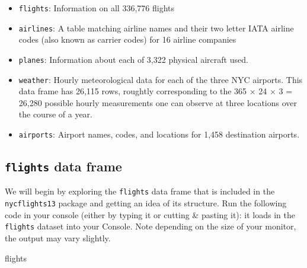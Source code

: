 \documentclass[
  letterpaper,
  DIV=11,
  numbers=noendperiod]{scrreprt}
\newenvironment{Shaded}{\begin{snugshade}}{\end{snugshade}}
\newcommand{\NormalTok}[1]{\textcolor[rgb]{0.00,0.23,0.31}{#1}}
\providecommand{\tightlist}{%
  \setlength{\itemsep}{0pt}\setlength{\parskip}{0pt}}\usepackage{longtable,booktabs,array}
\theoremstyle{definition}
\theoremstyle{remark}
\begin{document}
\begin{itemize}
\tightlist
\item
  \texttt{flights}: Information on all 336,776 flights
\item
  \texttt{airlines}: A table matching airline names and their two letter
  IATA airline codes (also known as carrier codes) for 16 airline
  companies
\item
  \texttt{planes}: Information about each of 3,322 physical aircraft
  used.
\item
  \texttt{weather}: Hourly meteorological data for each of the three NYC
  airports. This data frame has 26,115 rows, roughtly corresponding to
  the 365 \(\times\) 24 \(\times\) 3 = 26,280 possible hourly
  measurements one can observe at three locations over the course of a
  year.
\item
  \texttt{airports}: Airport names, codes, and locations for 1,458
  destination airports.
\end{itemize}

\hypertarget{flights-data-frame}{%
\subsection{\texorpdfstring{\texttt{flights} data
frame}{flights data frame}}\label{flights-data-frame}}

We will begin by exploring the \texttt{flights} data frame that is
included in the \texttt{nycflights13} package and getting an idea of its
structure. Run the following code in your console (either by typing it
or cutting \& pasting it): it loads in the \texttt{flights} dataset into
your Console. Note depending on the size of your monitor, the output may
vary slightly.

\begin{Shaded}
\begin{Highlighting}[]
\NormalTok{flights}
\end{Highlighting}
\end{Shaded}
\end{document}
